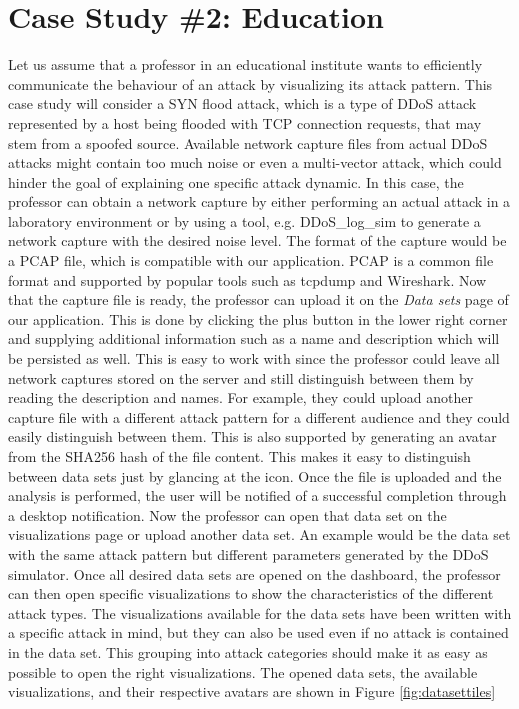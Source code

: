 \section{Case Study \#2: Education} \label{casestudyeducation}
Let us assume that a professor in an educational institute wants to efficiently communicate the behaviour of an attack by visualizing its attack pattern. This case study will consider a SYN flood attack, which is a type of DDoS attack represented by a host being flooded with TCP connection requests, that may stem from a spoofed source.
Available network capture files from actual DDoS attacks might contain too much noise or even a multi-vector attack, which could hinder the goal of explaining one specific attack dynamic. In this case, the professor can obtain a network capture by either performing an actual attack in a laboratory environment or by using a tool, e.g. DDoS\_log\_sim \cite{ddoslogsim} to generate a network capture with the desired noise level. The format of the capture would be a PCAP file, which is compatible with our application. PCAP is a common file format and supported by popular tools such as tcpdump and Wireshark.
Now that the capture file is ready, the professor can upload it on the \textit{Data sets} page of our application. This is done by clicking the plus button in the lower right corner and supplying additional information such as a name and description which will be persisted as well. This is easy to work with since the professor could leave all network captures stored on the server and still distinguish between them by reading the description and names. For example, they could upload another capture file with a different attack pattern for a different audience and they could easily distinguish between them. This is also supported by generating an avatar from the SHA256 hash of the file content. This makes it easy to distinguish between data sets just by glancing at the icon. Once the file is uploaded and the analysis is performed, the user will be notified of a successful completion through a desktop notification. Now the professor can open that data set on the visualizations page or upload another data set. An example would be the data set with the same attack pattern but different parameters generated by the DDoS simulator.
Once all desired data sets are opened on the dashboard, the professor can then open specific visualizations to show the characteristics of the different attack types. The visualizations available for the data sets have been written with a specific attack in mind, but they can also be used even if no attack is contained in the data set. This grouping into attack categories should make it as easy as possible to open the right visualizations. The opened data sets, the available visualizations, and their respective avatars are shown in Figure \ref{fig:datasettiles}


